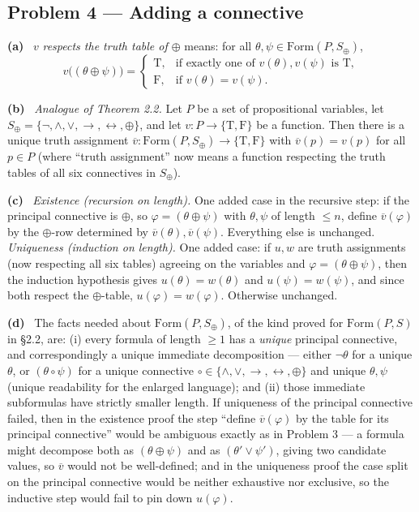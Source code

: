 \documentclass[11pt]{article}
\newcommand{\Form}{\mathrm{Form}}
\newcommand{\T}{\mathrm{T}}
\newcommand{\F}{\mathrm{F}}
\newcommand{\TF}{\{\T,\F\}}
\newcommand{\ext}[1]{\overline{#1}}
\newcommand{\bin}{\mathbin{\circ}}
\newcommand{\solpart}[1]{\smallskip\noindent\textbf{(#1)}\ }
\newcommand{\prob}[2]{\subsection*{Problem #1 --- #2}}
\begin{document}
\prob{4}{Adding a connective}

\solpart{a} $v$ \emph{respects the truth table of $\oplus$} means: for all
$\theta,\psi\in\Form(P,S_\oplus)$,
\[
v\big((\theta\oplus\psi)\big)=
\begin{cases}
\T, & \text{if exactly one of }v(\theta),v(\psi)\text{ is }\T,\\
\F, & \text{if }v(\theta)=v(\psi).
\end{cases}
\]

\solpart{b} \emph{Analogue of Theorem 2.2.} Let $P$ be a set of propositional
variables, let $S_\oplus=\{\lnot,\land,\lor,\to,\leftrightarrow,\oplus\}$, and let
$v\colon P\to\TF$ be a function. Then there is a unique truth assignment
$\ext{v}\colon\Form(P,S_\oplus)\to\TF$ with $\ext{v}(p)=v(p)$ for all $p\in P$
(where ``truth assignment'' now means a function respecting the truth tables of
all six connectives in $S_\oplus$).

\solpart{c} \emph{Existence (recursion on length).} One added case in the
recursive step: if the principal connective is $\oplus$, so $\varphi=(\theta\oplus
\psi)$ with $\theta,\psi$ of length $\le n$, define $\ext{v}(\varphi)$ by the
$\oplus$-row determined by $\ext{v}(\theta),\ext{v}(\psi)$. Everything else is
unchanged. \emph{Uniqueness (induction on length).} One added case: if
$u,w$ are truth assignments (now respecting all six tables) agreeing on the
variables and $\varphi=(\theta\oplus\psi)$, then the induction hypothesis gives
$u(\theta)=w(\theta)$ and $u(\psi)=w(\psi)$, and since both respect the
$\oplus$-table, $u(\varphi)=w(\varphi)$. Otherwise unchanged.

\solpart{d} The facts needed about $\Form(P,S_\oplus)$, of the kind proved for
$\Form(P,S)$ in \S 2.2, are: (i) every formula of length $\ge 1$ has a
\emph{unique} principal connective, and correspondingly a unique immediate
decomposition --- either $\lnot\theta$ for a unique $\theta$, or $(\theta\bin\psi)$
for a unique connective $\bin\in\{\land,\lor,\to,\leftrightarrow,\oplus\}$ and
unique $\theta,\psi$ (unique readability for the enlarged language); and (ii) those
immediate subformulas have strictly smaller length. If uniqueness of the principal
connective failed, then in the existence proof the step ``define $\ext{v}(\varphi)$
by the table for its principal connective'' would be ambiguous exactly as in
Problem 3 --- a formula might decompose both as $(\theta\oplus\psi)$ and as
$(\theta'\lor\psi')$, giving two candidate values, so $\ext{v}$ would not be
well-defined; and in the uniqueness proof the case split on the principal
connective would be neither exhaustive nor exclusive, so the inductive step would
fail to pin down $u(\varphi)$.
\end{document}
